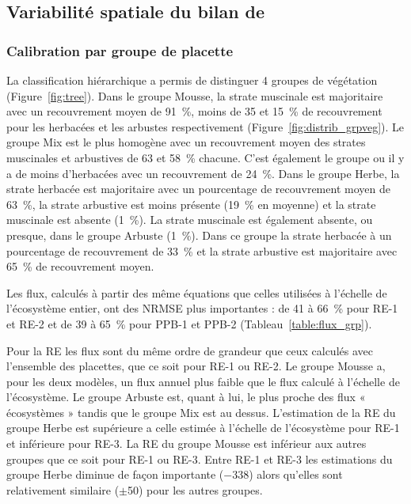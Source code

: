 \subsection{Variabilité spatiale du bilan de \coo}

\subsubsection{Calibration par groupe de placette}



La classification hiérarchique a permis de distinguer 4 groupes de végétation (Figure~\ref{fig:tree}).
Dans le groupe Mousse, la strate muscinale est majoritaire avec un recouvrement moyen de \SI{91}{\percent}, moins de \num{35} et \SI{15}{\percent} de recouvrement pour les herbacées et les arbustes respectivement (Figure~\ref{fig:distrib_grpveg}).
Le groupe Mix est le plus homogène avec un recouvrement moyen des strates muscinales et arbustives de \num{63} et \SI{58}{\percent} chacune.
C'est également le groupe ou il y a de moins d'herbacées avec un recouvrement de \SI{24}{\percent}.
Dans le groupe Herbe, la strate herbacée est majoritaire avec un pourcentage de recouvrement moyen de \SI{63}{\percent}, la strate arbustive est moins présente (\SI{19}{\percent} en moyenne) et la strate muscinale est absente (\SI{1}{\percent}).
La strate muscinale est également absente, ou presque, dans le groupe Arbuste (\SI{1}{\percent}).
Dans ce groupe la strate herbacée à un pourcentage de recouvrement de \SI{33}{\percent} et la strate arbustive est majoritaire avec \SI{65}{\percent} de recouvrement moyen.

Les flux, calculés à partir des même équations que celles utilisées à l'échelle de l'écosystème entier, ont des NRMSE plus importantes : de \num{41} à \SI{66}{\percent} pour RE-1 et RE-2 et de \num{39} à \SI{65}{\percent} pour PPB-1 et PPB-2 (Tableau~\ref{table:flux_grp}).

Pour la RE les flux sont du même ordre de grandeur que ceux calculés avec l'ensemble des placettes, que ce soit pour RE-1 ou RE-2.
Le groupe Mousse a, pour les deux modèles, un flux annuel plus faible que le flux calculé à l'échelle de l'écosystème.
Le groupe Arbuste est, quant à lui, le plus proche des flux « écosystèmes » tandis que le groupe Mix est au dessus.
L'estimation de la RE du groupe Herbe est supérieure a celle estimée à l'échelle de l'écosystème pour RE-1 et inférieure pour RE-3.
La RE du groupe Mousse est inférieur aux autres groupes que ce soit pour RE-1 ou RE-3. 
Entre RE-1 et RE-3 les estimations du groupe Herbe diminue de façon importante (\num{-338}) alors qu'elles sont relativement similaire ($\pm$\num{50}) pour les autres groupes.

